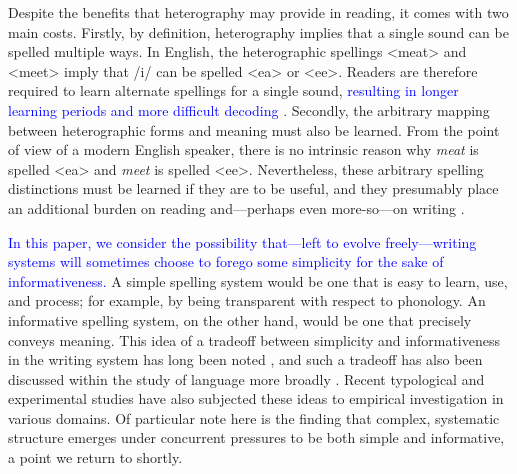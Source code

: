 \documentclass[doc,biblatex]{apa7}
\newcommand\newmaterial[1]{\textcolor{blue}{#1}}
\begin{document}
Despite the benefits that heterography may provide in reading, it comes with two main costs. Firstly, by definition, heterography implies that a single sound can be spelled multiple ways. In English, the heterographic spellings <meat> and <meet> imply that /i/ can be spelled <ea> or <ee>. Readers are therefore required to learn alternate spellings for a single sound, \newmaterial{resulting in longer learning periods and more difficult decoding} \parencite{Reis:2020, Seymour:2003, Spencer:2003, Taylor:2011, Zhao:2018}. Secondly, the arbitrary mapping between heterographic forms and meaning must also be learned. From the point of view of a modern English speaker, there is no intrinsic reason why \textit{meat} is spelled <ea> and \textit{meet} is spelled <ee>. Nevertheless, these arbitrary spelling distinctions must be learned if they are to be useful, and they presumably place an additional burden on reading and---perhaps even more-so---on writing \parencite{Frith:1979, Shankweiler:1992}.

\newmaterial{In this paper, we consider the possibility that---left to evolve freely---writing systems will sometimes choose to forego some simplicity for the sake of informativeness.} A simple spelling system would be one that is easy to learn, use, and process; for example, by being transparent with respect to phonology. An informative spelling system, on the other hand, would be one that precisely conveys meaning. This idea of a tradeoff between simplicity and informativeness in the writing system has long been noted \parencite[e.g.,][]{Coulmas:1991}, and such a tradeoff has also been discussed within the study of language more broadly \parencite[e.g.,][]{Gabelentz:1891, Zipf:1949, Martinet:1952, Rosch:1978}. Recent typological \parencite[e.g.,][]{Kemp:2018} and experimental \parencite[e.g.,][]{Kirby:2015} studies have also subjected these ideas to empirical investigation in various domains. Of particular note here is the finding that complex, systematic structure emerges under concurrent pressures to be both simple and informative, a point we return to shortly.
\end{document}
